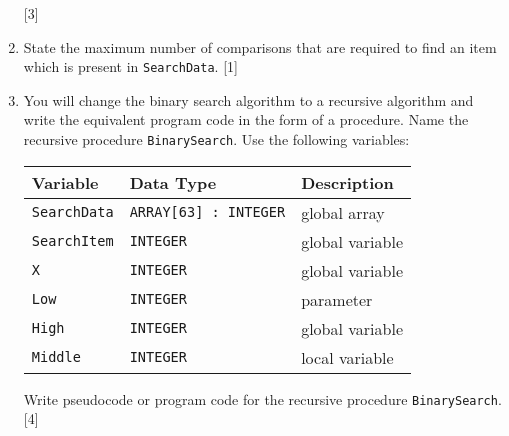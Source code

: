 \begin{enumerate}
\hfill{}{[}3{]}
\item State the maximum number of comparisons that are required to find
an item which is present in \texttt{SearchData}. \hfill{} {[}1{]}
\item You will change the binary search algorithm to a recursive algorithm
and write the equivalent program code in the form of a procedure.
Name the recursive procedure \texttt{BinarySearch}. Use the following
variables: 
\noindent \begin{center}
\begin{tabular}{|l|l|l|}
\hline 
\textbf{Variable} & \textbf{Data Type} & \textbf{Description}\tabularnewline
\hline 
\texttt{SearchData} & \texttt{ARRAY{[}63{]} : INTEGER} & global array\tabularnewline
\hline 
\texttt{SearchItem} & \texttt{INTEGER} & global variable\tabularnewline
\hline 
\texttt{X} & \texttt{INTEGER} & global variable\tabularnewline
\hline 
\texttt{Low} & \texttt{INTEGER} & parameter\tabularnewline
\hline 
\texttt{High} & \texttt{INTEGER} & global variable\tabularnewline
\hline 
\texttt{Middle} & \texttt{INTEGER} & local variable\tabularnewline
\hline 
\end{tabular} 
\par\end{center}

Write pseudocode or program code for the recursive procedure \texttt{BinarySearch}.
\hfill{}{[}4{]}
\end{enumerate}